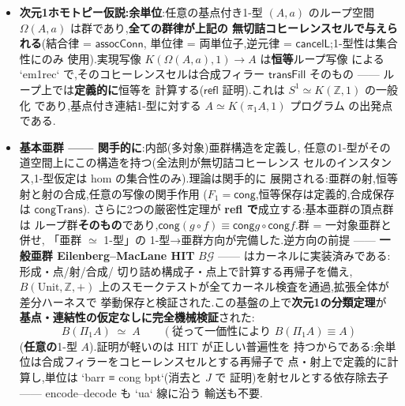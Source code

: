 \documentclass[11pt]{ltjsarticle}
\newcommand{\Z}{\mathbb{Z}}
\newcommand{\op}[1]{\ensuremath{\mathsf{#1}}}
\begin{document}
\begin{itemize}[leftmargin=1.5em]
  \textbf{連言面}による融合セル(面 $(l{=}0)\wedge(m{=}1)$ は補間の
  片端で恒偽,他端で $(l{=}0)$ に正規化 —— 両端で面系が異なるセルが
  構成可能になる),そして最後に\textbf{箱蓋セル}(接続立方体の全4辺を
  恒真面で崩壊させ,壁として両側の hfill 自身を用いる).カーネル側では
  チェッカーの面解決を正準 DNF 選言肢被覆へ一般化.三角形と合わせ,
  \textbf{Mac~Lane コヒーレンスの対が無切詰・公理なしで完成}した.
\item \textbf{次元1ホモトピー仮説:余単位}:任意の基点付き1-型 $(A,a)$
  のループ空間 $\Omega(A,a)$ は群であり,\textbf{全ての群律が上記の
  無切詰コヒーレンスセルで与えられる}(結合律 = $\op{assocConn}$,
  単位律 = 両単位子,逆元律 = $\op{cancelL}$;1-型性は集合性にのみ
  使用).実現写像 $K(\Omega(A,a),1) \to A$ は\textbf{恒等}ループ写像
  による `em1rec` で,そのコヒーレンスセルは合成フィラー
  $\op{transFill}$ そのもの —— ループ上では\textbf{定義的に}恒等を
  計算する($\op{refl}$ 証明).これは $S^1 \simeq K(\Z,1)$ の一般化
  であり,基点付き連結1-型に対する $A \simeq K(\pi_1 A,1)$ プログラム
  の出発点である.
\item \textbf{基本亜群 —— 関手的に}:内部(多対象)亜群構造を定義し,
  任意の1-型がその道空間上にこの構造を持つ(全法則が無切詰コヒーレンス
  セルのインスタンス,1-型仮定は hom の集合性のみ).理論は関手的に
  展開される:亜群の射,恒等射と射の合成,任意の写像の関手作用
  ($F_1 = \op{cong}$,恒等保存は定義的,合成保存は $\op{congTrans}$).
  さらに2つの厳密性定理が \textbf{refl で}成立する:基本亜群の頂点群は
  ループ群\textbf{そのもの}であり,$\op{cong}(g \circ f) \equiv
  \op{cong} g \circ \op{cong} f$.群 = 一対象亜群と併せ,
  「亜群 $\simeq$ 1-型」の 1-型→亜群方向が完備した.逆方向の前提 —— \textbf{一般亜群 Eilenberg--MacLane HIT}
  $B\mathcal{G}$ —— はカーネルに実装済みである:形成・点/射/合成/
  切り詰め構成子・点上で計算する再帰子を備え,$B(\mathrm{Unit},\Z,+)$
  上のスモークテストが全てカーネル検査を通過,拡張全体が差分ハーネスで
  挙動保存と検証された.この基盤の上で\textbf{次元1の分類定理}が
  \textbf{基点・連結性の仮定なしに完全機械検証}された:
  \[ B(\Pi_1 A) \;\simeq\; A \qquad(\text{従って一価性により }
     B(\Pi_1 A) \equiv A) \]
  (\textbf{任意の}1-型 $A$).証明が軽いのは HIT が正しい普遍性を
  持つからである:余単位は合成フィラーをコヒーレンスセルとする再帰子で
  点・射上で定義的に計算し,単位は `barr ≡ cong bpt`(消去と $J$ で
  証明)を射セルとする依存除去子 —— encode--decode も `ua` 線に沿う
  輸送も不要.
\end{itemize}
\end{document}
